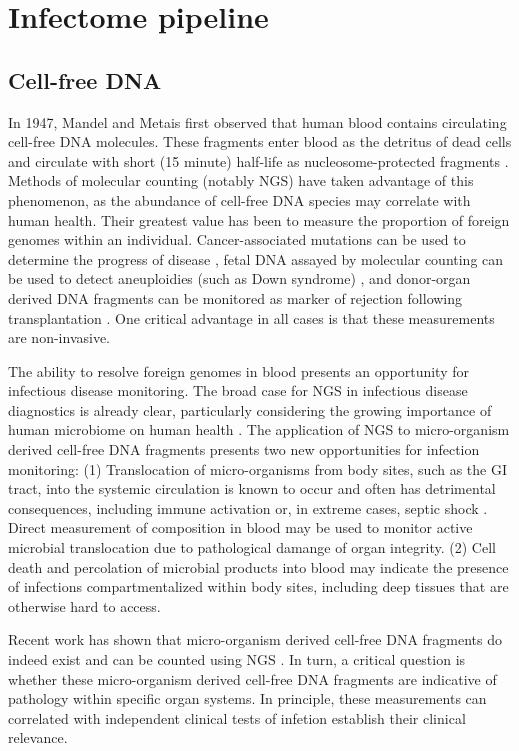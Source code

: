 \chapter{Infectome pipeline}

\section{Cell-free DNA}

In 1947, Mandel and Metais first observed that human blood contains circulating cell-free DNA molecules. These fragments enter blood as the detritus of dead cells and circulate with short (15 minute) half-life as nucleosome-protected fragments \cite{Quake:2012iy}. Methods of molecular counting (notably NGS) have taken advantage of this phenomenon, as the abundance of cell-free DNA species may correlate with human health. Their greatest value has been to measure the proportion of foreign genomes within an individual. Cancer-associated mutations can be used to determine the progress of disease \cite{Newman:2014ik}, fetal DNA assayed by molecular counting can be used to detect aneuploidies (such as Down syndrome) \cite{Fan:2008ww}, and donor-organ derived DNA fragments can be monitored as marker of rejection following transplantation \cite{DeVlaminck:2013hl}. One critical advantage in all cases is that these measurements are non-invasive. 

The ability to resolve foreign genomes in blood presents an opportunity for infectious disease monitoring. The broad case for NGS in infectious disease diagnostics is already clear, particularly considering the growing importance of human microbiome on human health \cite{Consortium:2012bb}. The application of NGS to micro-organism derived cell-free DNA fragments presents two new opportunities for infection monitoring: (1) Translocation of micro-organisms from body sites, such as the GI tract, into the systemic circulation is known to occur and often has detrimental consequences, including immune activation or, in extreme cases, septic shock \cite{Brenchley:2012bm}. Direct measurement of composition in blood may be used to monitor active microbial translocation due to pathological damange of organ integrity. (2) Cell death and percolation of microbial products into blood may indicate the presence of infections compartmentalized within body sites, including deep tissues that are otherwise hard to access.

Recent work has shown that micro-organism derived cell-free DNA fragments do indeed exist and can be counted using NGS \cite{DeVlaminck:2013hl}. In turn, a critical question is whether these micro-organism derived cell-free DNA fragments are indicative of pathology within specific organ systems. In principle, these measurements can correlated with independent clinical tests of infetion establish their clinical relevance.

